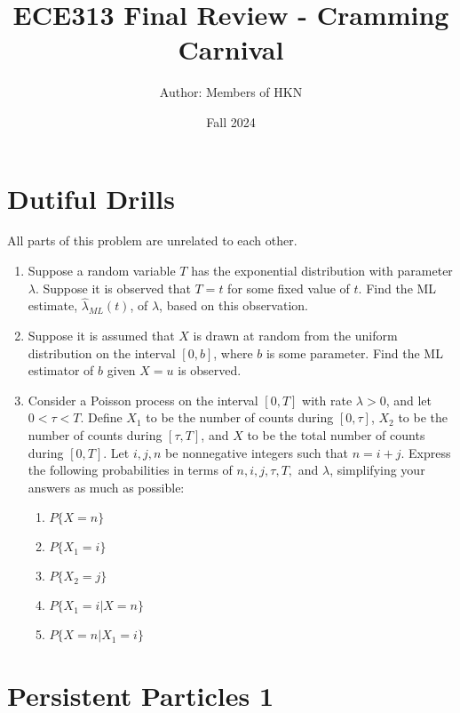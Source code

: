 \documentclass{article}
\title{ECE313 Final Review - Cramming Carnival}
\author{Author: Members of HKN}
\date{Fall 2024}
\begin{document}
\maketitle

\section{Dutiful Drills}

All parts of this problem are unrelated to each other.

\begin{enumerate}[label=(\alph*)]
\itemsep0em
    \item Suppose a random variable $T$ has the exponential distribution with parameter $\lambda$. Suppose it is observed that $T = t$ for some fixed value of $t$. Find the ML estimate, $\hat{\lambda}_{ML}(t)$, of $\lambda$, based on this observation. \vfill
    \item Suppose it is assumed that $X$ is drawn at random from the uniform distribution on the interval $[0, b]$, where $b$ is some parameter. Find the ML estimator of $b$ given $X = u$ is observed. \vfill
    \item Consider a Poisson process on the interval $[0, T]$ with rate $\lambda > 0$, and let $0 < \tau < T$. Define $X_1$ to be the number of counts during $[0, \tau]$, $X_2$ to be the number of counts during $[\tau, T]$, and $X$ to be the total number of counts during $[0, T]$. Let $i, j, n$ be nonnegative integers such that $n = i + j$. Express the following probabilities in terms of $n, i, j, \tau, T, $ and $\lambda$, simplifying your answers as much as possible:

    \begin{enumerate}[label=(\roman*)]
    \itemsep3em
        \item $P\{X = n\}$
        \item $P\{X_1 = i\}$
        \item $P\{X_2 = j\}$
        \item $P\{X_1 = i \vert X = n\}$
        \item $P\{X = n \vert X_1 = i\}$
    \end{enumerate}
\end{enumerate}

\vspace{3em}

\newpage

\section{Persistent Particles 1}
\end{document}
